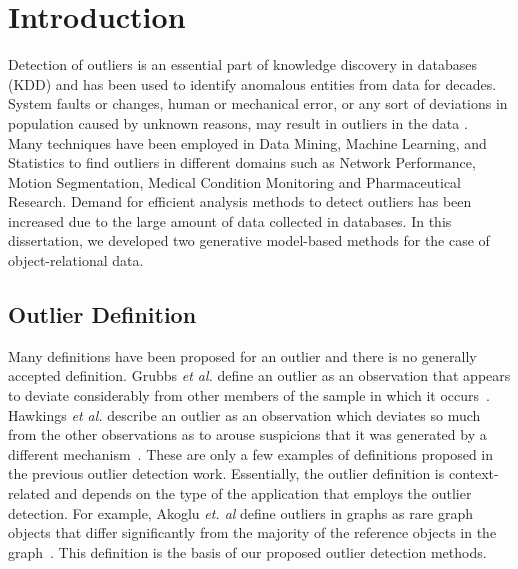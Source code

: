 
%
%

\chapter{Introduction}\label{chap:one}
Detection of outliers is an essential part of knowledge discovery in databases (KDD) and has been used to identify  anomalous entities from data for decades. System faults or changes, human or mechanical error, or any sort of deviations in population caused by unknown reasons, may result in outliers in the data \cite{Hodge2004}.\\
Many techniques have been employed in Data Mining, Machine Learning, and Statistics to find outliers in different domains such as Network Performance, Motion Segmentation, Medical Condition Monitoring and Pharmaceutical Research. Demand for efficient analysis methods to detect outliers has been increased due to the large amount of data collected in databases. In this dissertation, we developed two generative model-based methods for the case of object-relational data. 

\section{Outlier Definition}\label{sec:outdefinition}

Many definitions have been proposed for an outlier and there is no generally accepted definition. Grubbs {\em et al.} define an outlier as an observation that appears to deviate considerably from other members of the sample in which it occurs~\cite{grubbs1969}. Hawkings {\em et al.} describe an outlier as an observation which deviates so much from the other observations as to arouse suspicions that it was generated by a different mechanism~\cite{Hawkins1980}. These are only a few examples of definitions proposed in the previous outlier detection work. Essentially, the outlier definition is context-related and depends on the type of the application that employs the outlier detection.  For example, Akoglu {\em et. al} define outliers in graphs as rare graph objects that differ significantly from the majority of the reference objects in the graph~\cite{Akoglu2010}. This definition is the basis of our proposed outlier detection methods.  

